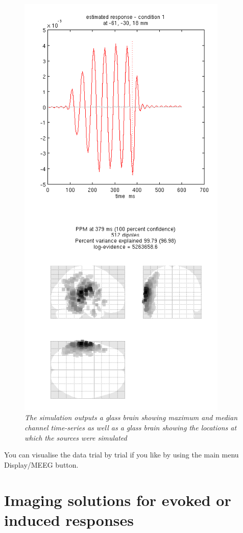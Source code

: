 \begin{figure}
\begin{center}
\includegraphics[width=100mm]{meg_sloc/slide2}
\caption{\em The simulation outputs a glass brain showing maximum and median channel time-series as well as a glass brain showing the locations at which the sources were simulated} \label{meg_sloc:fig:2}
\end{center}
\end{figure}

You can visualise the data trial by trial if you like by using the main menu Display/MEEG button.
\section{Imaging solutions for evoked or induced responses}

